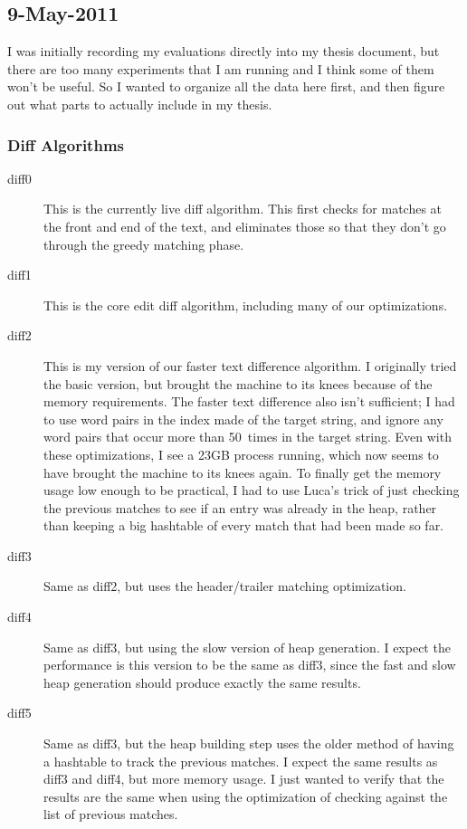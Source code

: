 \subsection{9-May-2011}

I was initially recording my evaluations directly into my thesis
document, but there are too many experiments that I am running
and I think some of them won't be useful.
So I wanted to organize all the data here first, and then
figure out what parts to actually include in my thesis.

\subsubsection{Diff Algorithms}

\begin{description}
\item[diff0] This is the currently live diff algorithm.
	This first checks for matches at the front and end of
	the text, and eliminates those so that they don't go
	through the greedy matching phase.
\item[diff1] This is the core edit diff algorithm, including
	many of our optimizations.
\item[diff2] This is my version of our faster text difference algorithm.
    I originally tried the basic version, but brought the machine to
    its knees because of the memory requirements.
    The faster text difference also isn't sufficient; I had to
    use word pairs in the index made of the target string,
    and ignore any word pairs that occur more than 50~times
    in the target string.  Even with these optimizations, I
    see a 23GB process running, which now seems to have brought
    the machine to its knees again.
    To finally get the memory usage low enough to be practical,
    I had to use Luca's trick of just checking the previous
    matches to see if an entry was already in the heap,
    rather than keeping a big hashtable of every match that
    had been made so far.
\item[diff3] Same as diff2, but uses the header/trailer matching
    optimization.
\item[diff4] Same as diff3, but using the slow version of heap
    generation.  I expect the performance is this version to be
    the same as diff3, since the fast and slow heap generation
    should produce exactly the same results.
\item[diff5] Same as diff3, but the heap building step uses the older
    method of having a hashtable to track the previous matches.
    I expect the same results as diff3 and diff4, but more memory usage.
    I just wanted to verify that the results are the same when
    using the optimization of checking against the list of previous
    matches.
\end{description}

